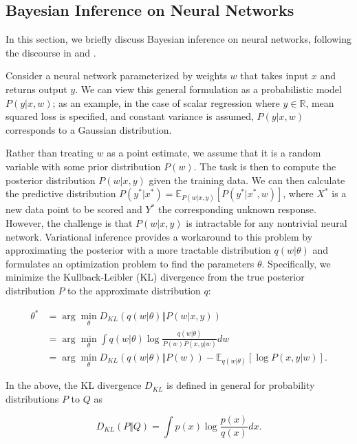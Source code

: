 \documentclass{article}
\begin{document}
\subsection{Bayesian Inference on Neural Networks} \label{section:bnn}

In this section, we briefly discuss Bayesian inference on neural networks, following the discourse in \cite{graves2011practical} and \cite{blundell2015weight}.

Consider a neural network parameterized by weights $w$ that takes input $x$ and returns output $y$. We can view this general formulation as a probabilistic model $P(y|x, w)$; as an example, in the case of scalar regression where $y \in \mathbb{R}$, mean squared loss is specified, and constant variance is assumed, $P(y|x, w)$ corresponds to a Gaussian distribution.

Rather than treating $w$ as a point estimate, we assume that it is a random variable with some prior distribution $P(w)$. The task is then to compute the posterior distribution $P(w|x, y)$ given the training data. We can then calculate the predictive distribution $P(y^*|x^*) = \mathbb{E}_{P(w|x, y)}[P(y^*|x^*, w)]$, where $X^*$ is a new data point to be scored and $Y^*$ the corresponding unknown response. However, the challenge is that $P(w|x, y)$ is intractable for any nontrivial neural network. Variational inference provides a workaround to this problem by approximating the posterior with a more tractable distribution $q(w|\theta)$ and formulates an optimization problem to find the parameters $\theta$. Specifically, we minimize the Kullback-Leibler (KL) divergence from the true posterior distribution $P$ to the approximate distribution $q$:

\begin{align}
    \theta^* &= \arg \min_\theta D_{KL}(q(w|\theta) \Vert P(w|x, y))\\
             &= \arg \min_\theta \int q(w|\theta) \log \frac{q(w|\theta)}{P(w)P(x, y|w)} dw\\
             &= \arg \min_\theta D_{KL}(q(w|\theta) \Vert P(w)) - \mathbb{E}_{q(w|\theta)}[\log P(x, y|w)]. \label{eq:1}
\end{align}

In the above, the KL divergence $D_{KL}$ is defined in general for probability distributions $P$ to $Q$ as

\begin{equation}
    D_{KL}(P \Vert Q) = \int p(x) \log \frac{p(x)}{q(x)} dx.
\end{equation}
\end{document}
